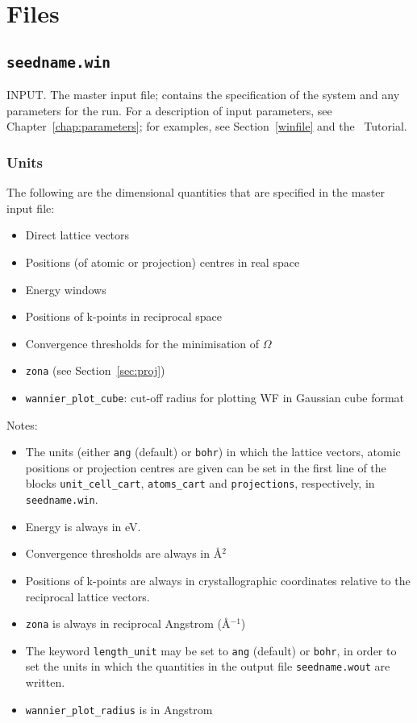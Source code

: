 \chapter{Files}


\section{{\tt seedname.win}}
INPUT. The master input file; contains the specification of the system
and any parameters for the run. For a description of input parameters,
see Chapter~\ref{chap:parameters}; for examples, see
Section~\ref{winfile} and the \wannier\
Tutorial.

\subsection{Units}

The following are the dimensional quantities that are
specified in the master input file:

\begin{itemize}
\item Direct lattice vectors
\item Positions (of atomic or projection) centres in real space
\item Energy windows
\item Positions of k-points in reciprocal space
\item Convergence thresholds for the minimisation of $\Omega$
\item \verb#zona# (see Section~\ref{sec:proj})
\item \verb#wannier_plot_cube#: cut-off radius for plotting WF in
  Gaussian cube format
\end{itemize}

Notes:

\begin{itemize}
\item The units (either \verb#ang#
  (default) or \verb#bohr#) in which the lattice vectors, atomic
  positions or projection centres are given can be set in the first
  line of the blocks 
  \verb#unit_cell_cart#, \verb#atoms_cart# and \verb#projections#,
  respectively, in \verb#seedname.win#.
\item Energy is always in eV.
\item Convergence thresholds are always in \AA$^{2}$
\item Positions of k-points are always in crystallographic
  coordinates relative to the reciprocal lattice vectors.
\item \verb#zona# is always in reciprocal Angstrom (\AA$^{-1}$)
\item The keyword \verb#length_unit# may be set to \verb#ang#
  (default) or \verb#bohr#, in order to set the units in which the
  quantities in the output file {\tt seedname.wout} are written.
\item \verb#wannier_plot_radius# is in Angstrom
\end{itemize}

